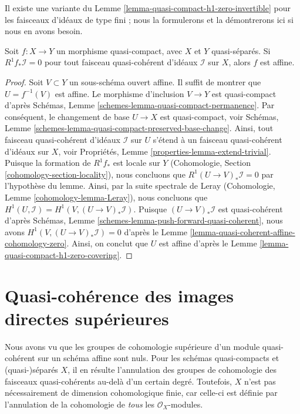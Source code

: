 \noindent
Il existe une variante du Lemme \ref{lemma-quasi-compact-h1-zero-invertible}
pour les faisceaux d'idéaux de type fini ; nous la formulerons et la
démontrerons ici si nous en avons besoin.

\begin{lemma}
\label{lemma-criterion-affine-morphism}
Soit $f : X \to Y$ un morphisme quasi-compact, avec $X$ et $Y$ quasi-séparés.
Si $R^1f_*\mathcal{I} = 0$ pour tout faisceau quasi-cohérent d'idéaux
$\mathcal{I}$ sur $X$, alors $f$ est affine.
\end{lemma}

\begin{proof}
Soit $V \subset Y$ un sous-schéma ouvert affine. Il suffit de montrer que
$U = f^{-1}(V)$ est affine. Le morphisme d'inclusion $V \to Y$ est quasi-compact
d'après Schémas, Lemme \ref{schemes-lemma-quasi-compact-permanence}. Par
conséquent, le changement de base $U \to X$ est quasi-compact, voir Schémas,
Lemme \ref{schemes-lemma-quasi-compact-preserved-base-change}. Ainsi, tout
faisceau quasi-cohérent d'idéaux $\mathcal{I}$ sur $U$ s'étend à un faisceau
quasi-cohérent d'idéaux sur $X$, voir Propriétés, Lemme
\ref{properties-lemma-extend-trivial}. Puisque la formation de $R^1f_*$ est
locale sur $Y$ (Cohomologie, Section \ref{cohomology-section-locality}), nous
concluons que $R^1(U \to V)_*\mathcal{I} = 0$ par l'hypothèse du lemme.
Ainsi, par la suite spectrale de Leray (Cohomologie, Lemme
\ref{cohomology-lemma-Leray}), nous concluons que $H^1(U, \mathcal{I}) = H^1(V, (U \to V)_*\mathcal{I})$. Puisque $(U \to V)_*\mathcal{I}$ est quasi-cohérent
d'après Schémas, Lemme \ref{schemes-lemma-push-forward-quasi-coherent}, nous
avons $H^1(V, (U \to V)_*\mathcal{I}) = 0$ d'après le Lemme
\ref{lemma-quasi-coherent-affine-cohomology-zero}. Ainsi, on conclut que $U$
est affine d'après le Lemme \ref{lemma-quasi-compact-h1-zero-covering}.
\end{proof}








\section{Quasi-cohérence des images directes supérieures}
\label{section-quasi-coherence}

\noindent
Nous avons vu que les groupes de cohomologie supérieure d'un module quasi-cohérent sur
un schéma affine sont nuls. Pour les schémas quasi-compacts et (quasi-)séparés $X$, il en résulte
l'annulation des groupes de cohomologie des faisceaux quasi-cohérents au-delà d'un certain
degré. Toutefois, $X$ n'est pas nécessairement de dimension cohomologique
finie, car celle-ci est définie par l'annulation de la cohomologie
de {\it tous} les $\mathcal{O}_X$-modules.

